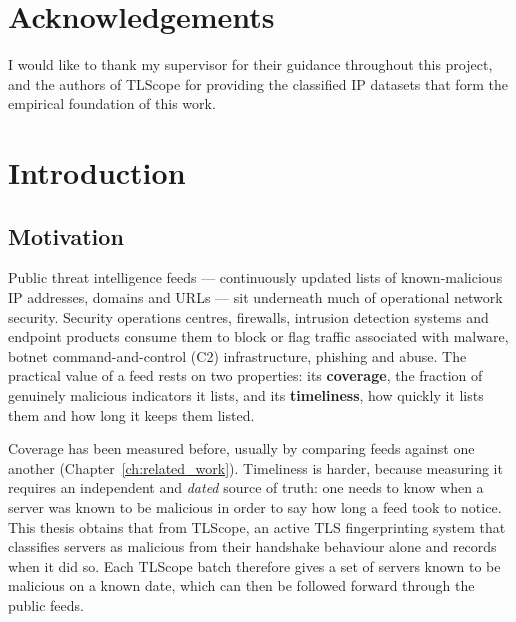 \chapter*{Acknowledgements}

I would like to thank my supervisor for their guidance throughout this project,
and the authors of TLScope for providing the classified IP datasets that form the
empirical foundation of this work.

\cleardoublepage

\tableofcontents
\cleardoublepage

\listoffigures
{}
\cleardoublepage

\listoftables
{}
\cleardoublepage

\glsaddall
\printglossary[type=\acronymtype, title={List of Abbreviations}, nonumberlist]
\cleardoublepage


\chapter{Introduction}
\label{ch:introduction}

\section{Motivation}

Public threat intelligence feeds --- continuously updated lists of known-malicious IP addresses,
domains and URLs --- sit underneath much of operational network security. Security operations
centres, firewalls, intrusion detection systems and endpoint products consume them to block or flag
traffic associated with malware, botnet command-and-control (C2) infrastructure, phishing and abuse.
The practical value of a feed rests on two properties: its \textbf{coverage}, the fraction of
genuinely malicious indicators it lists, and its \textbf{timeliness}, how quickly it lists them and
how long it keeps them listed.

Coverage has been measured before, usually by comparing feeds against one another
(Chapter~\ref{ch:related_work}). Timeliness is harder, because measuring it requires an independent
and \emph{dated} source of truth: one needs to know when a server was known to be malicious in order
to say how long a feed took to notice. This thesis obtains that from TLScope, an active TLS
fingerprinting system that classifies servers as malicious from their handshake behaviour alone and
records when it did so. Each TLScope batch therefore gives a set of servers known to be malicious on
a known date, which can then be followed forward through the public feeds.

